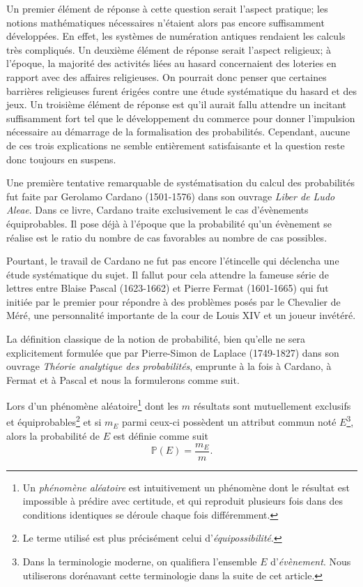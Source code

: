 \documentclass[11pt,a4paper]{article}
\begin{document}
Un premier élément de réponse à cette question serait l'aspect pratique; les notions mathématiques nécessaires n'étaient alors pas encore suffisamment développées. En effet, les systèmes de numération antiques rendaient les calculs très compliqués. Un deuxième élément de réponse serait l'aspect religieux; à l'époque, la majorité des activités liées au hasard concernaient des loteries en rapport avec des affaires religieuses. On pourrait donc penser que certaines barrières religieuses furent érigées contre une étude systématique du hasard et des jeux. Un troisième élément de réponse est qu'il aurait fallu attendre un incitant suffisamment fort tel que le développement du commerce pour donner l'impulsion nécessaire au démarrage de la formalisation des probabilités. Cependant, aucune de ces trois explications ne semble entièrement satisfaisante et la question reste donc toujours en suspens.

Une première tentative remarquable de systématisation du calcul des probabilités fut faite par Gerolamo Cardano (1501-1576) dans son ouvrage \textit{Liber de Ludo Aleae}. Dans ce livre, Cardano traite exclusivement le cas d'évènements équiprobables. Il pose déjà à l'époque que la probabilité qu'un évènement se réalise est le ratio du nombre de cas favorables au nombre de cas possibles.

Pourtant, le travail de Cardano ne fut pas encore l'étincelle qui déclencha une étude systématique du sujet. Il fallut pour cela attendre la fameuse série de lettres entre Blaise Pascal (1623-1662) et Pierre Fermat (1601-1665) qui fut initiée par le premier pour répondre à des problèmes posés par le Chevalier de Méré, une personnalité importante de la cour de Louis XIV et un joueur invétéré.

La définition classique de la notion de probabilité, bien qu'elle ne sera explicitement formulée que par Pierre-Simon de Laplace (1749-1827) dans son ouvrage \textit{Théorie analytique des probabilités}, emprunte à la fois à Cardano, à Fermat et à Pascal et nous la formulerons comme suit.

\begin{Def}[Classique]{\rm Lors d'un phénomène aléatoire\footnote{Un \textit{phénomène aléatoire} est intuitivement un phénomène dont le résultat est impossible à prédire avec certitude, et qui reproduit plusieurs fois dans des conditions identiques se déroule chaque fois différemment.} dont les $m$ résultats sont mutuellement exclusifs et équiprobables\footnote{Le terme utilisé est plus précisément celui d'\textit{équipossibilité}.} et si $m_E$ parmi ceux-ci possèdent un attribut commun noté $E$\footnote{Dans la terminologie moderne, on qualifiera l'ensemble $E$ d'\textit{évènement}. Nous utiliserons dorénavant cette terminologie dans la suite de cet article.}, alors la probabilité de $E$ est définie comme suit
\[\mathbb{P}(E) = \frac{m_E}{m}.\]
}
\end{Def}
\end{document}
